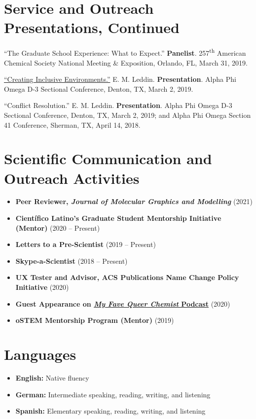 \documentclass[letterpaper,11pt]{article}
\newcommand{\resumeItem}[2]{
  \item
    \textbf{#1}{ #2 \vspace{-2pt}}
}
\newcommand{\resumeSubItem}[2]{\resumeItem{#1}{#2}\vspace{-4pt}}
\newcommand{\positionSubItem}[2]{\resumeItem{#1\textnormal{:}} {#2}\vspace{-4pt}}
\newcommand{\resumeSubHeadingListStart}{\begin{itemize}[leftmargin=*]}
\newcommand{\resumeSubHeadingListEnd}{\end{itemize}}
\begin{document}
\section{Service and Outreach Presentations, Continued}
\begin{etaremune}[start=3]

  \item \textnormal{``The Graduate School Experience: What to Expect.'' \textbf{Panelist}. 257\textsuperscript{th} American Chemical Society National Meeting \& Exposition, Orlando, FL, March 31, 2019.}
  \item \textnormal{ \href{https://docs.google.com/presentation/d/1mKDUxe-elMQ7EkTBglIQBeZlcsdBwmfP5loLxAsshF0/edit}{``Creating Inclusive Environments.''} E. M. Leddin. \textbf{Presentation}. Alpha Phi Omega D-3 Sectional Conference, Denton, TX, March 2, 2019.}
  \item \textnormal{``Conflict Resolution.'' E. M. Leddin. \textbf{Presentation}. Alpha Phi Omega D-3 Sectional Conference, Denton, TX, March 2, 2019; and Alpha Phi Omega Section 41 Conference, Sherman, TX, April 14, 2018.}
\end{etaremune}

\section{Scientific Communication and Outreach Activities}
  \resumeSubHeadingListStart
    \resumeSubItem{Peer Reviewer, \emph{Journal of Molecular Graphics and Modelling}}
      {(2021)}
    \resumeSubItem{Cient\'{i}fico Latino's Graduate Student Mentorship Initiative (Mentor)}
      {(2020 -- Present)}
    \resumeSubItem{Letters to a Pre-Scientist}
      {(2019 -- Present)}
   \resumeSubItem{Skype-a-Scientist}
      {(2018 -- Present)}
    \resumeSubItem{UX Tester and Advisor, ACS Publications Name Change Policy Initiative}
      {(2020)}
    \resumeSubItem{Guest Appearance on \href{https://www.stitcher.com/show/my-fave-queer-chemist/episode/emmett-leddin-university-of-north-texas-69219314}{\emph{My Fave Queer Chemist} Podcast}}
      {(2020)}
    \resumeSubItem{oSTEM Mentorship Program (Mentor)}
      {(2019)}
  \resumeSubHeadingListEnd

\section{Languages}
  \resumeSubHeadingListStart
    \positionSubItem{English}
      {Native fluency}
    \positionSubItem{German}
      {Intermediate speaking, reading, writing, and listening}
    \positionSubItem{Spanish}
      {Elementary speaking, reading, writing, and listening}
\resumeSubHeadingListEnd
\end{document}
